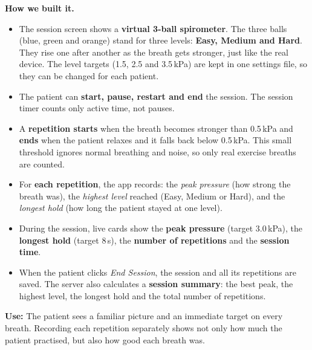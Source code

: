 \documentclass[12pt,a4paper]{article}
\begin{document}
\textbf{How we built it.}
\begin{itemize}
  \item The session screen shows a \textbf{virtual 3-ball spirometer}. The three balls (blue, green and orange) stand for three levels: \textbf{Easy, Medium and Hard}. They rise one after another as the breath gets stronger, just like the real device. The level targets (1.5, 2.5 and 3.5\,kPa) are kept in one settings file, so they can be changed for each patient.
  \item The patient can \textbf{start, pause, restart and end} the session. The session timer counts only active time, not pauses.
  \item A \textbf{repetition starts} when the breath becomes stronger than 0.5\,kPa and \textbf{ends} when the patient relaxes and it falls back below 0.5\,kPa. This small threshold ignores normal breathing and noise, so only real exercise breaths are counted.
  \item For \textbf{each repetition}, the app records: the \emph{peak pressure} (how strong the breath was), the \emph{highest level} reached (Easy, Medium or Hard), and the \emph{longest hold} (how long the patient stayed at one level).
  \item During the session, live cards show the \textbf{peak pressure} (target 3.0\,kPa), the \textbf{longest hold} (target 8\,s), the \textbf{number of repetitions} and the \textbf{session time}.
  \item When the patient clicks \emph{End Session}, the session and all its repetitions are saved. The server also calculates a \textbf{session summary}: the best peak, the highest level, the longest hold and the total number of repetitions.
\end{itemize}

\textbf{Use:} The patient sees a familiar picture and an immediate target on every breath. Recording each repetition separately shows not only how much the patient practised, but also how good each breath was.
\end{document}
